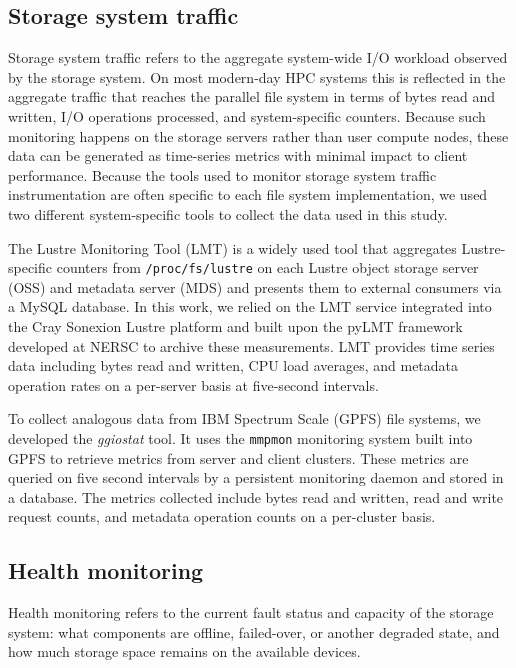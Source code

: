\subsection{Storage system traffic} \label{sec:methods/storagesystraffic}

Storage system traffic refers to the aggregate system-wide I/O workload observed by the storage system.
On most modern-day HPC systems this is reflected in the aggregate traffic that reaches the parallel file system in terms of bytes read and written, I/O operations processed, and system-specific counters.
Because such monitoring happens on the storage servers rather than user compute nodes, these data can be generated as time-series metrics with minimal impact to client performance.
Because the tools used to monitor storage system traffic instrumentation are often specific to each file system implementation, we used two different system-specific tools to collect the data used in this study.

\label{sec:methods/lmt}
The Lustre Monitoring Tool (LMT) is a widely used tool that aggregates Lustre-specific counters from \texttt{/proc/fs/lustre} on each Lustre object storage server (OSS) and metadata server (MDS) and presents them to external consumers via a MySQL database.
In this work, we relied on the LMT service integrated into the Cray Sonexion Lustre platform \cite{Keopp2014} and built upon the pyLMT framework developed at NERSC \cite{Uselton2009} to archive these measurements.
LMT provides time series data including bytes read and written, CPU load averages, and metadata operation rates on a per-server basis at five-second intervals.

\label{sec:methods/ggiostat}
To collect analogous data from IBM Spectrum Scale (GPFS) file systems, we developed the \emph{ggiostat} tool.
It uses the \texttt{mmpmon} monitoring system built into GPFS to retrieve metrics from server and client clusters.
These metrics are queried on five second intervals by a persistent monitoring daemon and stored in a database.
The metrics collected include bytes read and written, read and write request counts, and metadata operation counts on a per-cluster basis.

\subsection{Health monitoring} \label{sec:methods/health}

Health monitoring refers to the current fault status and capacity of the
storage system: what components are offline, failed-over, or another degraded state, and how much storage space remains on the available devices.

